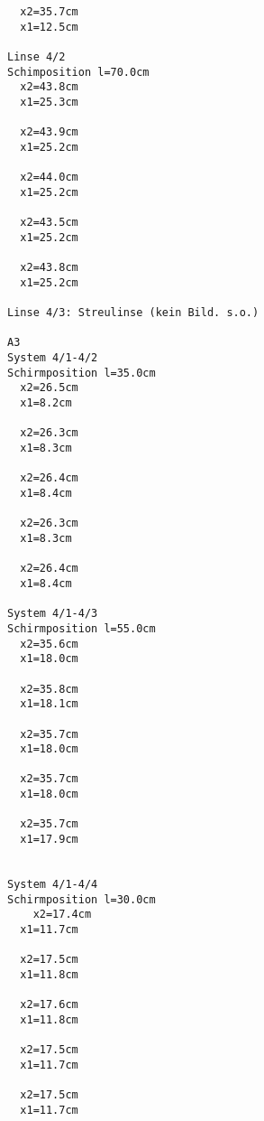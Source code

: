 \documentclass[12pt,a4paper,notitlepage]{article}
\begin{document}
\begin{verbatim}
  x2=35.7cm
  x1=12.5cm

Linse 4/2
Schimposition l=70.0cm
  x2=43.8cm
  x1=25.3cm

  x2=43.9cm
  x1=25.2cm

  x2=44.0cm
  x1=25.2cm

  x2=43.5cm
  x1=25.2cm

  x2=43.8cm
  x1=25.2cm

Linse 4/3: Streulinse (kein Bild. s.o.)

A3
System 4/1-4/2
Schirmposition l=35.0cm
  x2=26.5cm
  x1=8.2cm

  x2=26.3cm
  x1=8.3cm

  x2=26.4cm
  x1=8.4cm

  x2=26.3cm
  x1=8.3cm

  x2=26.4cm
  x1=8.4cm

System 4/1-4/3
Schirmposition l=55.0cm
  x2=35.6cm
  x1=18.0cm

  x2=35.8cm
  x1=18.1cm

  x2=35.7cm
  x1=18.0cm

  x2=35.7cm
  x1=18.0cm

  x2=35.7cm
  x1=17.9cm


System 4/1-4/4
Schirmposition l=30.0cm
    x2=17.4cm
  x1=11.7cm

  x2=17.5cm
  x1=11.8cm

  x2=17.6cm
  x1=11.8cm

  x2=17.5cm
  x1=11.7cm

  x2=17.5cm
  x1=11.7cm

\end{verbatim}
\end{document}
